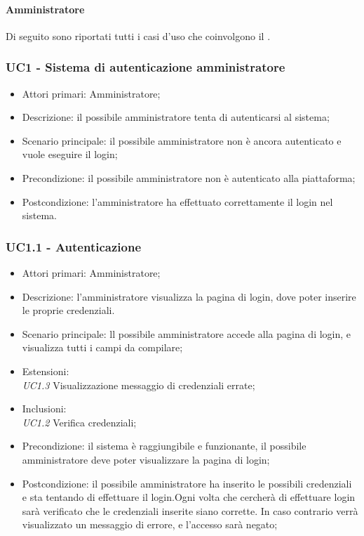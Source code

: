 ﻿\paragraph{Amministratore}
Di seguito sono riportati tutti i casi d'uso che coinvolgono il  .


\subsubsection{UC1 - Sistema di autenticazione amministratore}

\begin{itemize}
\item Attori primari: Amministratore;
\item Descrizione: il possibile amministratore tenta di autenticarsi al sistema;
\item Scenario principale: il possibile amministratore non è ancora autenticato e vuole eseguire il login;
\item Precondizione: il possibile amministratore non è autenticato alla piattaforma;
\item Postcondizione: l'amministratore ha effettuato correttamente il login nel sistema.

\end{itemize}

\subsubsection{UC1.1 - Autenticazione}

\begin{itemize}
\item Attori primari: Amministratore;
\item Descrizione: l'amministratore visualizza la pagina di login, dove poter inserire le proprie credenziali. 
\item Scenario principale: ll possibile amministratore accede alla pagina di login, e visualizza tutti i campi da compilare;
\item Estensioni: \\\emph{UC1.3} Visualizzazione messaggio di credenziali errate;
\item Inclusioni: \\\emph{UC1.2} Verifica credenziali;
\item Precondizione: il sistema è raggiungibile e funzionante, il possibile amministratore deve poter visualizzare la pagina di login;
\item Postcondizione: il possibile amministratore ha inserito le possibili credenziali e sta tentando di effettuare il login.Ogni volta che cercherà di effettuare
login sarà verificato che le credenziali inserite siano corrette. In caso contrario verrà visualizzato un messaggio di errore, e l'accesso sarà negato;

\end{itemize}


